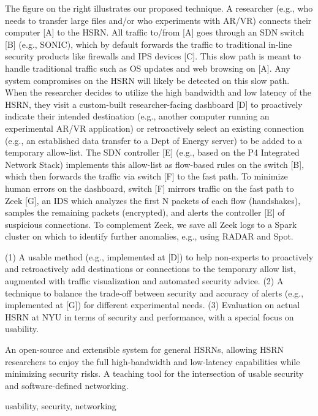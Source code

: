 The figure on the right illustrates our proposed technique. A researcher (e.g., who needs to transfer large files and/or who experiments with AR/VR) connects their computer [A] to the HSRN. All traffic to/from [A] goes through an SDN switch [B] (e.g., SONIC), which by default forwards the traffic to traditional in-line security products like firewalls and IPS devices [C]. This slow path is meant to handle traditional traffic such as OS updates and web browsing on [A]. Any system compromises on the HSRN will likely be detected on this slow path. When the researcher decides to utilize the high bandwidth and low latency of the HSRN, they visit a custom-built researcher-facing dashboard [D] to proactively indicate their intended destination (e.g., another computer running an experimental AR/VR application) or retroactively select an existing connection (e.g., an established data transfer to a Dept of Energy server) to be added to a temporary allow-list. The SDN controller [E] (e.g., based on the P4 Integrated Network Stack) implements this allow-list as flow-based rules on the switch [B], which then forwards the traffic via switch [F] to the fast path. To minimize human errors on the dashboard, switch [F] mirrors traffic on the fast path to Zeek [G], an IDS which analyzes the first N packets of each flow (handshakes), samples the remaining packets (encrypted), and alerts the controller [E] of suspicious connections. To complement Zeek, we save all Zeek logs to a Spark cluster on which to identify further anomalies, e.g., using RADAR and Spot.


(1) A usable method (e.g., implemented at [D]) to help non-experts to proactively and retroactively add destinations or connections to the temporary allow list, augmented with traffic visualization and automated security advice. (2) A technique to balance the trade-off between security and accuracy of alerts (e.g., implemented at [G]) for different experimental needs. (3) Evaluation on actual HSRN at NYU in terms of security and performance, with a special focus on usability.


An open-source and extensible system for general HSRNs, allowing HSRN researchers to enjoy the full high-bandwidth and low-latency capabilities while minimizing security risks. A teaching tool for the intersection of usable security and software-defined networking.


 usability, security, networking
